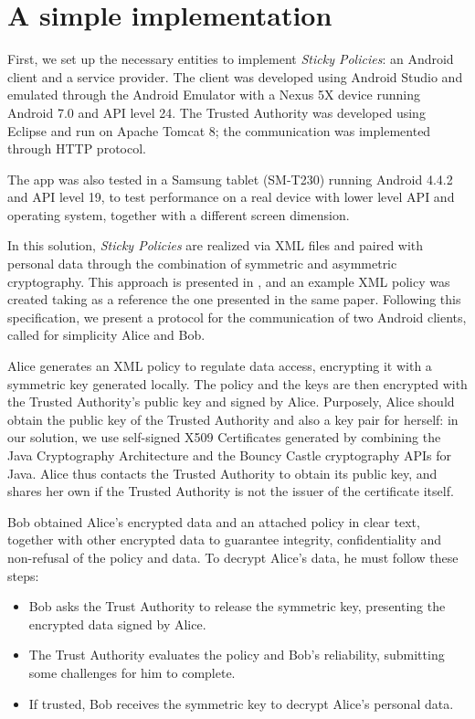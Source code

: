 \chapter{A simple implementation}
\label{chapter3}
\thispagestyle{empty}

\noindent First, we set up the necessary entities to implement \textit{Sticky Policies}: an Android client and a service provider. The client was developed using Android Studio and emulated through the Android Emulator with a Nexus 5X device running Android 7.0 and API level 24. The Trusted Authority was developed using Eclipse and run on Apache Tomcat 8; the communication was implemented through HTTP protocol.

The app was also tested in a Samsung tablet (SM-T230) running Android 4.4.2 and API level 19, to test performance on a real device with lower level API and operating system, together with a different screen dimension.

In this solution, \textit{Sticky Policies} are realized via XML files and paired with personal data through the combination of symmetric and asymmetric cryptography. This approach is presented in \cite{pearson2011sticky}, and an example XML policy was created taking as a reference the one presented in the same paper. Following this specification, we present a protocol for the communication of two Android clients, called for simplicity Alice and Bob. 

Alice generates an XML policy to regulate data access, encrypting it with a symmetric key generated locally. The policy and the keys are then encrypted with the Trusted Authority's public key and signed by Alice. Purposely, Alice should obtain the public key of the Trusted Authority and also a key pair for herself: in our solution, we use self-signed X509 Certificates generated by combining the Java Cryptography Architecture and the Bouncy Castle cryptography APIs for Java. Alice thus contacts the Trusted Authority to obtain its public key, and shares her own if the Trusted Authority is not the issuer of the certificate itself.

Bob obtained Alice's encrypted data and an attached policy in clear text, together with other encrypted data to guarantee integrity, confidentiality and non-refusal of the policy and data. To decrypt Alice's data, he must follow these steps:
\begin{itemize}
	\item Bob asks the Trust Authority to release the symmetric key, presenting the encrypted data signed by Alice.
	\item The Trust Authority evaluates the policy and Bob's reliability, submitting some challenges for him to complete.
	\item If trusted, Bob receives the symmetric key to decrypt Alice's personal data.
\end{itemize}

